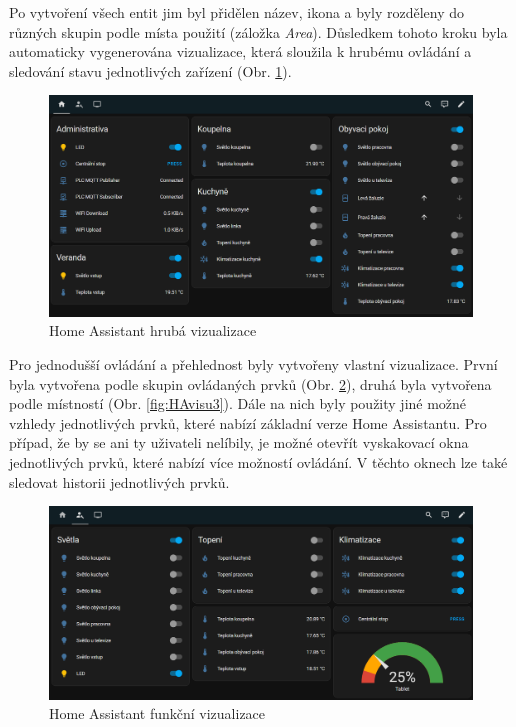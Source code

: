 Po vytvoření všech entit jim byl přidělen název, ikona a byly rozděleny do různých skupin podle místa použití (záložka \textit{Area}). Důsledkem tohoto kroku byla automaticky vygenerována vizualizace, která sloužila k hrubému ovládání a sledování stavu jednotlivých zařízení (Obr. \ref{fig:HAvisu1}).

\begin{figure}[!ht]
    \begin{center}
        \includegraphics[scale=0.35]{obrazky/Dashboard1.png}
    \end{center}
    \caption[Home Assistant hrubá vizualizace]{Home Assistant hrubá vizualizace}
    \label{fig:HAvisu1}
\end{figure}

Pro jednodušší ovládání a přehlednost byly vytvořeny vlastní vizualizace. První byla vytvořena podle skupin ovládaných prvků (Obr. \ref{fig:HAvisu2}), druhá byla vytvořena podle místností (Obr. \ref{fig:HAvisu3}). Dále na nich byly použity jiné možné vzhledy jednotlivých prvků, které nabízí základní verze Home Assistantu. Pro případ, že by se ani ty uživateli nelíbily, je možné otevřít vyskakovací okna jednotlivých prvků, které nabízí více možností ovládání. V těchto oknech lze také sledovat historii jednotlivých prvků.

\begin{figure}[!ht]
    \begin{center}
        \includegraphics[scale=0.35]{obrazky/Dashboard2.png}
    \end{center}
    \caption[Home Assistant funkční vizualizace]{Home Assistant funkční vizualizace}
    \label{fig:HAvisu2}
\end{figure}

